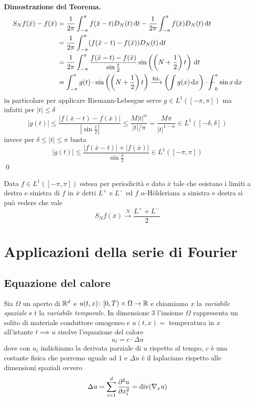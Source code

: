 \textbf{Dimostrazione del Teorema.}
$$
\begin{aligned}
	S_N f(\bar x) - f(\bar x) 
	&= \frac{1}{2\pi} \int_{-\pi}^\pi f(\bar x - t) D_N(t) \dd t - \frac{1}{2\pi} \int_{-\pi}^\pi f(\bar x) D_N(t) \dd t \\
	&= \frac{1}{2\pi} \int_{-\pi}^\pi (f(\bar x - t) - f(\bar x)) D_N(t) \dd t \\
	&= \frac{1}{2\pi} \int_{-\pi}^\pi \frac{f(\bar x - t) - f(\bar x)}{\sin \frac{t}{2}} \sin \left(\left(N + \frac{1}{2}\right) t\right) \dd t \\
	&= \int_{-\pi}^\pi g(t) \cdot \sin \left(\left(N + \frac{1}{2}\right) t\right)
	\xrightarrow{\text{RL}} \left(\int g(x) \dd x\right) \cdot \avint_0^\pi \sin x \dd x
\end{aligned}
$$
in particolare per applicare Riemann-Lebesgue serve $g \in L^1([-\pi, \pi])$ ma infatti per $|t| \leq \delta$
$$
|g(t)| \leq \frac{|f(\bar x - t) - f(\bar x)|}{|\sin \frac{t}{2}|} \leq \frac{M |t|^\alpha}{|t| / \pi} = \frac{M \pi}{|t|^{1 - \alpha}} \in L^1([-\delta, \delta])
$$
invece per $\delta \leq |t| \leq \pi$ basta
$$
|g(t)| \leq \frac{|f(\bar x - t)| + |f(\bar x)|}{\sin \frac{\delta}{2}} \in L^1([-\pi, \pi])
$$
\qed

Data $f \in L^1([-\pi, \pi])$ estesa per periodicità e dato $\bar x$ tale che esistano i limiti a destra e sinistra di $f$ in $\bar x$ detti $L^+$ e $L^-$ ed $f$ $\alpha$-H\"olderiana a sinistra e destra si può vedere che vale
$$
S_N f(\bar x) \xrightarrow{N} \frac{L^+ + L^-}{2}
$$

\chapter{Applicazioni della serie di Fourier}

\section{Equazione del calore}

Sia $\Omega$ un aperto di $\mathbb R^d$ e $u(t, x) \colon [0, T) \times \Omega \to \mathbb R$ e chiamiamo $x$ la \textit{variabile spaziale} e $t$ la \textit{variabile temporale}. In dimensione $3$ l'insieme $\Omega$ rappresenta un solito di materiale conduttore omogeneo  e $u(t, x) = $ temperatura in $x$ all'istante $t \implies u$ risolve l'equazione del calore
$$
u_t = c \cdot \Delta u
$$
dove con $u_t$ indichiamo la derivata parziale di $u$ rispetto al tempo, $c$ è una costante fisica che porremo uguale ad $1$ e $\Delta u$ è il laplaciano rispetto alle dimensioni spaziali ovvero
$$
\Delta u = \sum_{i=1}^d \frac{\partial^2 u}{\partial x_i^2} = \operatorname{div}(\nabla_x u)
$$

